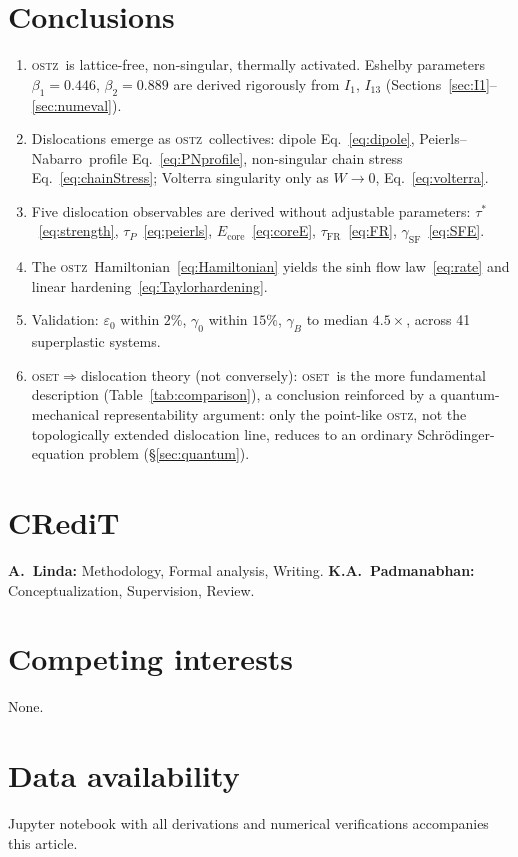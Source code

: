 \documentclass[5p,sort&compress]{elsarticle}
\newcommand{\OSTZ}{\textsc{ostz}}
\newcommand{\OSET}{\textsc{oset}}
\newcommand{\gz}{\gamma_0}
\newcommand{\PN}{Peierls--Nabarro}
\begin{document}
\section{Conclusions}
\label{sec:conclusions}

\begin{enumerate}

\item \OSTZ\ is lattice-free, non-singular, thermally activated.
  Eshelby parameters $\beta_1=0.446$, $\beta_2=0.889$ are derived
  rigorously from $I_1$, $I_{13}$
  (Sections~\ref{sec:I1}--\ref{sec:numeval}).

\item Dislocations emerge as \OSTZ\ collectives:
  dipole Eq.~\eqref{eq:dipole}, \PN\ profile Eq.~\eqref{eq:PNprofile},
  non-singular chain stress Eq.~\eqref{eq:chainStress}; Volterra
  singularity only as $W\to0$, Eq.~\eqref{eq:volterra}.

\item Five dislocation observables are derived without adjustable
  parameters: $\tau^*$~\eqref{eq:strength}, $\tau_P$~\eqref{eq:peierls},
  $E_\text{core}$~\eqref{eq:coreE}, $\tau_\text{FR}$~\eqref{eq:FR},
  $\gamma_\text{SF}$~\eqref{eq:SFE}.

\item The \OSTZ\ Hamiltonian~\eqref{eq:Hamiltonian} yields the sinh
  flow law~\eqref{eq:rate} and linear
  hardening~\eqref{eq:Taylorhardening}.

\item Validation: $\varepsilon_0$ within $2\%$, $\gz$ within $15\%$,
  $\gamma_B$ to median $4.5\times$, across 41 superplastic systems.

\item \OSET$\Rightarrow$dislocation theory (not conversely):
  \OSET\ is the more fundamental description
  (Table~\ref{tab:comparison}), a conclusion reinforced by a
  quantum-mechanical representability argument: only the point-like
  \OSTZ, not the topologically extended dislocation line, reduces to
  an ordinary Schr\"odinger-equation problem (\S\ref{sec:quantum}).

\end{enumerate}

\section*{CRediT}
\textbf{A.~Linda:} Methodology, Formal analysis, Writing.
\textbf{K.A.~Padmanabhan:} Conceptualization, Supervision, Review.

\section*{Competing interests}
None.

\section*{Data availability}
Jupyter notebook with all derivations and numerical verifications
accompanies this article.



\end{document}
